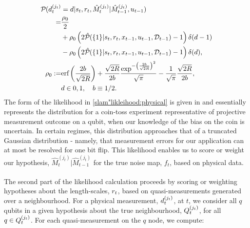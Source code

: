 \begin{align}
\mathcal{P}_{} ( d^{( j_t )}_{t}&=d | s_{ t}, r_{ t}, \hat{M}_t^{(j_t)}| \hat{M}_{t-1}^{(j_t)}, u_{t-1} ) \nonumber \\
 = & \frac{\rho_0}{2} \nonumber \\
& + \rho_0 \left(  2\hat{\mathcal{P}}_{} (\{1\} | s_{ t}, r_{ t}, x_{t-1}, u_{t-1}, \mathcal{D}_{t-1}) - 1 \right)  \delta(d-1) \nonumber \\
& - \rho_0 \left(  2\hat{\mathcal{P}}_{} (\{1\} | s_{ t}, r_{ t}, x_{t-1}, u_{t-1}, \mathcal{D}_{t-1}) - 1 \right) \delta(d), \label{slam"likleihood:physical} \\
\rho_0 :=& \text{erf}\left( \frac{2b}{\sqrt{2R}}\right) + \frac{\sqrt{2R}}{2b}\frac{\exp^{-\left( \frac{2b}{\sqrt{2R}}\right)^2}}{\sqrt{\pi}} - \frac{1}{\sqrt{\pi}} \frac{\sqrt{2R}}{2b}, \\
&d \in {0,1}, \quad b \equiv 1/2. 
\end{align} The form of the likelihood  in \cref{slam"likleihood:physical} is given in \cite{riddhissensorpaper} and essentially represents the distribution for a coin-toss experiment representative of projective measurement outcome on a qubit, when our knowledge of the bias on the coin is uncertain. In certain regimes, this distribution approaches that of a truncated Gaussian distribution - namely, that measurement errors for our application can at most be resolved for one bit flip. This likelihood enables us to score or weight our hypothesis, $\hat{M}_t^{(j_t)}| \hat{M}_{t-1}^{(j_t)}$ for the true noise map, $f_t$, based on physical data. \\
\\
The second part of the likelihood calculation proceeds by scoring or weighting hypotheses about the length-scales, $r_{ t}$, based on quasi-measurements generated over a neighbourhood. For a physical measurement, $d^{( j_t )}_{t}$, at $t$, we consider all $q$ qubits in a given hypothesis about the true neighbourhood, $Q^{( j_t )}_{t}$, for all $q \in Q^{( j_t )}_{t}$. For each quasi-measurement on the $q$ node, we compute:
